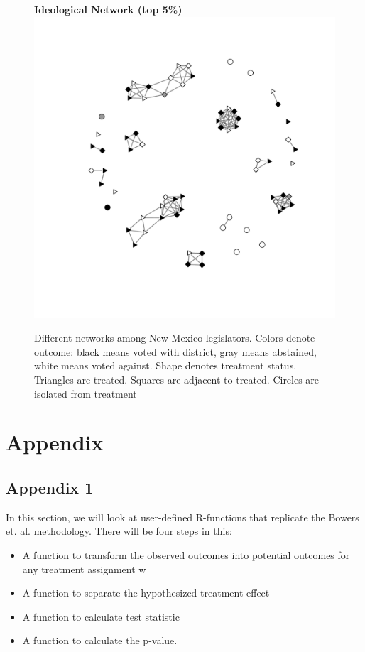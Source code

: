 \documentclass[12pt]{article}
\begin{document}
\begin{figure}
\begin{tabular}{cc}
\end{tabular}
{\bf Ideological Network (top 5\%)} \\
\includegraphics[scale=.55, clip=true,trim =2cm 2cm 2cm 2cm]{./images/coppock_ideological_net.pdf}
\caption{Different networks among New Mexico legislators. Colors denote outcome: black means voted with district, gray means abstained, white means voted against. Shape denotes treatment status. Triangles are treated. Squares are adjacent to treated. Circles are isolated from treatment}
\label{fig:nh-nets}
\end{figure}


\section{Appendix}
\subsection{Appendix 1}

In this section, we will look at user-defined R-functions that replicate the Bowers et. al. methodology. There will be four steps in this:

\begin{itemize}
\item A function to transform the observed outcomes into potential outcomes for any treatment assignment w
\item A function to separate the hypothesized treatment effect
\item A function to calculate test statistic
\item A function to calculate the p-value.
\end{itemize}
\end{document}
